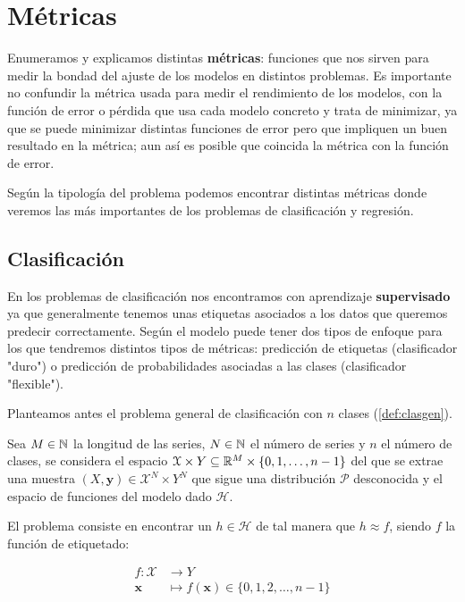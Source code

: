 %

\chapter{Métricas}\label{ch:metricas}

Enumeramos y explicamos distintas \textbf{métricas}: funciones que nos sirven para medir la bondad del ajuste de los modelos en distintos problemas. Es importante no confundir la métrica usada para medir el rendimiento de los modelos, con la función de error o pérdida que usa cada modelo concreto y trata de minimizar, ya que se puede minimizar distintas funciones de error pero que impliquen un buen resultado en la métrica; aun así es posible que coincida la métrica con la función de error.

Según la tipología del problema podemos encontrar distintas métricas donde veremos las más importantes de los problemas de clasificación y regresión.

\section{Clasificación}

En los problemas de clasificación nos encontramos con aprendizaje \textbf{supervisado} ya que generalmente tenemos unas etiquetas asociados a los datos que queremos predecir correctamente. Según el modelo puede tener dos tipos de enfoque para los que tendremos distintos tipos de métricas: predicción de etiquetas (clasificador "duro") o predicción de probabilidades asociadas a las clases (clasificador "flexible").

Planteamos antes el problema general de clasificación con $n$ clases (\autoref{def:clasgen}).

\begin{definicion}
  Sea $M \in \mathbb{N}$ la longitud de las series, $N \in \mathbb{N}$ el número de series y $n$ el número de clases, se considera el espacio $\mathcal{X} \times Y \subseteq \mathbb{R}^M \times \{0, 1, \ldots, n - 1\}$ del que se extrae una muestra $(X, \textbf{y}) \in \mathcal{X}^N \times Y^N$ que sigue una distribución $\mathcal{P}$ desconocida y el espacio de funciones del modelo dado $\mathcal{H}$.

  El problema consiste en encontrar un $h \in \mathcal{H}$ de tal manera que $h \approx f$, siendo $f$ la función de etiquetado:

  \begin{align*}
    f : \mathcal{X} & \to Y \\
    \textbf{x} & \mapsto f(\textbf{x}) \in \{0, 1, 2, \ldots, n - 1\}
  \end{align*}
  \label{def:clasgen}
\end{definicion}

